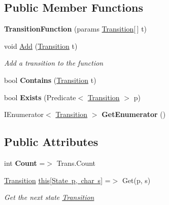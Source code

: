 \subsection*{Public Member Functions}
\begin{DoxyCompactItemize}
\item 
\mbox{\label{class_system_1_1_automata_1_1_transition_function_a2eb826c0a54140e72ccd5e7f092ec7a4}} 
{\bfseries Transition\+Function} (params \mbox{\hyperlink{class_system_1_1_automata_1_1_transition}{Transition}}\mbox{[}$\,$\mbox{]} t)
\item 
void \mbox{\hyperlink{class_system_1_1_automata_1_1_transition_function_a14ad89fa854a2d313381f986d348be88}{Add}} (\mbox{\hyperlink{class_system_1_1_automata_1_1_transition}{Transition}} t)
\begin{DoxyCompactList}\small\item\em Add a transition to the function \end{DoxyCompactList}\item 
\mbox{\label{class_system_1_1_automata_1_1_transition_function_a73aeeac22367c08bf2dac0068c726a60}} 
bool {\bfseries Contains} (\mbox{\hyperlink{class_system_1_1_automata_1_1_transition}{Transition}} t)
\item 
\mbox{\label{class_system_1_1_automata_1_1_transition_function_a397318c941b1f3b0b349c945f7b71109}} 
bool {\bfseries Exists} (Predicate$<$ \mbox{\hyperlink{class_system_1_1_automata_1_1_transition}{Transition}} $>$ p)
\item 
\mbox{\label{class_system_1_1_automata_1_1_transition_function_a5ef277ec52104ed77a05056dc6fa1895}} 
I\+Enumerator$<$ \mbox{\hyperlink{class_system_1_1_automata_1_1_transition}{Transition}} $>$ {\bfseries Get\+Enumerator} ()
\end{DoxyCompactItemize}
\subsection*{Public Attributes}
\begin{DoxyCompactItemize}
\item 
\mbox{\label{class_system_1_1_automata_1_1_transition_function_abcc64a0e83783e95e29985d157d74f6b}} 
int {\bfseries Count} =$>$ Trans.\+Count
\item 
\mbox{\hyperlink{class_system_1_1_automata_1_1_transition}{Transition}} \mbox{\hyperlink{class_system_1_1_automata_1_1_transition_function_a887174305e7741235859aceff5556bbd}{this\mbox{[}\+State p, char s\mbox{]}}} =$>$ Get(p, s)
\begin{DoxyCompactList}\small\item\em Get the next state \mbox{\hyperlink{class_system_1_1_automata_1_1_transition}{Transition}} \end{DoxyCompactList}\end{DoxyCompactItemize}
